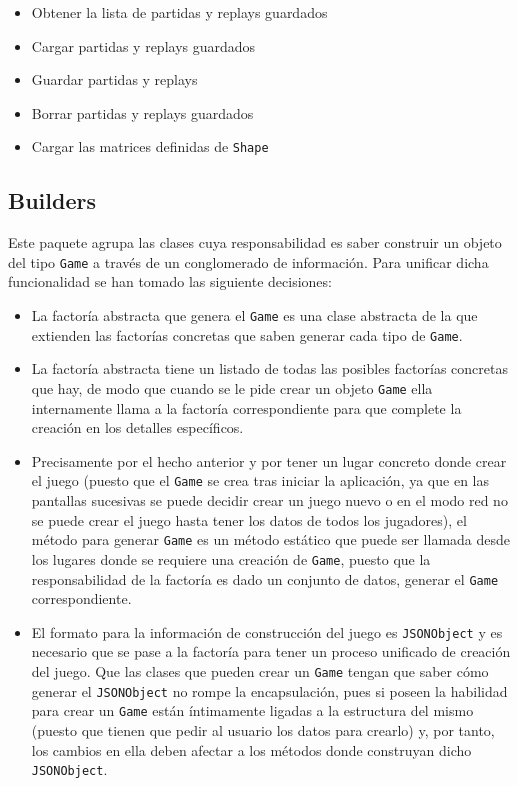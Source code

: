 \documentclass[../DocumentoOficial.tex]{subfiles}
\begin{document}
\begin{itemize}
\item Obtener la lista de partidas y replays guardados
\item Cargar partidas y replays guardados
\item Guardar partidas y replays
\item Borrar partidas y replays guardados
\item Cargar las matrices definidas de \texttt{Shape}
\end{itemize}

\subsection{Builders}
Este paquete agrupa las clases cuya responsabilidad es saber construir un objeto del tipo \texttt{Game} a través de un conglomerado de información. Para unificar dicha funcionalidad se han tomado las siguiente decisiones:
\begin{itemize}
\item La factoría abstracta que genera el \texttt{Game} es una clase abstracta de la que extienden las factorías concretas que saben generar cada tipo de \texttt{Game}.

\item La factoría abstracta tiene un listado de todas las posibles factorías concretas que hay, de modo que cuando se le pide crear un objeto \texttt{Game} ella internamente llama a la factoría correspondiente para que complete la creación en los detalles específicos.

\item Precisamente por el hecho anterior y por tener un lugar concreto donde crear el juego (puesto que el \texttt{Game} se crea tras iniciar la aplicación, ya que en las pantallas sucesivas se puede decidir crear un juego nuevo o en el modo red no se puede crear el juego hasta tener los datos de todos los jugadores), el método para generar \texttt{Game} es un método estático que puede ser llamada desde los lugares donde se requiere una creación de \texttt{Game}, puesto que la responsabilidad de la factoría es dado un conjunto de datos, generar el \texttt{Game} correspondiente.

\item El formato para la información de construcción del juego es \texttt{JSONObject} y es necesario que se pase a la factoría para tener un proceso unificado de creación del juego. Que las clases que pueden crear un \texttt{Game} tengan que saber cómo generar el \texttt{JSONObject} no rompe la encapsulación, pues si poseen la habilidad para crear un \texttt{Game} están íntimamente ligadas a la estructura del mismo (puesto que tienen que pedir al usuario los datos para crearlo) y, por tanto, los cambios en ella deben afectar a los métodos donde construyan dicho \texttt{JSONObject}.
\end{itemize}
\end{document}
